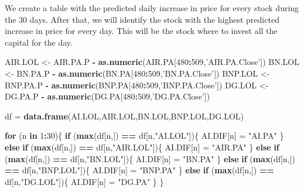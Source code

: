 \documentclass[
  11pt,
]{article}
\newenvironment{Shaded}{\begin{snugshade}}{\end{snugshade}}
\newcommand{\ControlFlowTok}[1]{\textcolor[rgb]{0.13,0.29,0.53}{\textbf{#1}}}
\newcommand{\DecValTok}[1]{\textcolor[rgb]{0.00,0.00,0.81}{#1}}
\newcommand{\KeywordTok}[1]{\textcolor[rgb]{0.13,0.29,0.53}{\textbf{#1}}}
\newcommand{\NormalTok}[1]{#1}
\newcommand{\OperatorTok}[1]{\textcolor[rgb]{0.81,0.36,0.00}{\textbf{#1}}}
\newcommand{\StringTok}[1]{\textcolor[rgb]{0.31,0.60,0.02}{#1}}
\begin{document}
We create a table with the predicted daily increase in price for every
stock during the 30 days. After that, we will identify the stock with
the highest predicted increase in price for every day. This will be the
stock where to invest all the capital for the day.

\begin{Shaded}
\begin{Highlighting}[]
\NormalTok{AIR.LOL <-}\StringTok{ }\NormalTok{AIR.PA.P }\OperatorTok{-}\StringTok{ }\KeywordTok{as.numeric}\NormalTok{(AIR.PA[}\DecValTok{480}\OperatorTok{:}\DecValTok{509}\NormalTok{,}\StringTok{'AIR.PA.Close'}\NormalTok{])}
\NormalTok{BN.LOL <-}\StringTok{ }\NormalTok{BN.PA.P }\OperatorTok{-}\StringTok{ }\KeywordTok{as.numeric}\NormalTok{(BN.PA[}\DecValTok{480}\OperatorTok{:}\DecValTok{509}\NormalTok{,}\StringTok{'BN.PA.Close'}\NormalTok{])}
\NormalTok{BNP.LOL <-}\StringTok{ }\NormalTok{BNP.PA.P }\OperatorTok{-}\StringTok{ }\KeywordTok{as.numeric}\NormalTok{(BNP.PA[}\DecValTok{480}\OperatorTok{:}\DecValTok{509}\NormalTok{,}\StringTok{'BNP.PA.Close'}\NormalTok{])}
\NormalTok{DG.LOL <-}\StringTok{ }\NormalTok{DG.PA.P }\OperatorTok{-}\StringTok{ }\KeywordTok{as.numeric}\NormalTok{(DG.PA[}\DecValTok{480}\OperatorTok{:}\DecValTok{509}\NormalTok{,}\StringTok{'DG.PA.Close'}\NormalTok{])}

\NormalTok{df =}\StringTok{ }\KeywordTok{data.frame}\NormalTok{(AI.LOL,AIR.LOL,BN.LOL,BNP.LOL,DG.LOL)}

\ControlFlowTok{for}\NormalTok{ (n }\ControlFlowTok{in} \DecValTok{1}\OperatorTok{:}\DecValTok{30}\NormalTok{)\{}
   \ControlFlowTok{if}\NormalTok{ (}\KeywordTok{max}\NormalTok{(df[n,]) }\OperatorTok{==}\StringTok{ }\NormalTok{df[n,}\StringTok{"AI.LOL"}\NormalTok{])\{}
\NormalTok{   AI.DIF[n] =}\StringTok{ "AI.PA"}
\NormalTok{   \} }\ControlFlowTok{else} \ControlFlowTok{if}\NormalTok{ (}\KeywordTok{max}\NormalTok{(df[n,]) }\OperatorTok{==}\StringTok{ }\NormalTok{df[n,}\StringTok{"AIR.LOL"}\NormalTok{])\{}
\NormalTok{   AI.DIF[n] =}\StringTok{ "AIR.PA"}
\NormalTok{   \} }\ControlFlowTok{else} \ControlFlowTok{if}\NormalTok{ (}\KeywordTok{max}\NormalTok{(df[n,]) }\OperatorTok{==}\StringTok{ }\NormalTok{df[n,}\StringTok{"BN.LOL"}\NormalTok{])\{}
\NormalTok{   AI.DIF[n] =}\StringTok{ "BN.PA"}
\NormalTok{   \} }\ControlFlowTok{else} \ControlFlowTok{if}\NormalTok{ (}\KeywordTok{max}\NormalTok{(df[n,]) }\OperatorTok{==}\StringTok{ }\NormalTok{df[n,}\StringTok{"BNP.LOL"}\NormalTok{])\{}
\NormalTok{   AI.DIF[n] =}\StringTok{ "BNP.PA"}
\NormalTok{   \} }\ControlFlowTok{else} \ControlFlowTok{if}\NormalTok{ (}\KeywordTok{max}\NormalTok{(df[n,]) }\OperatorTok{==}\StringTok{ }\NormalTok{df[n,}\StringTok{"DG.LOL"}\NormalTok{])\{}
\NormalTok{   AI.DIF[n] =}\StringTok{ "DG.PA"}
\NormalTok{   \}}
\NormalTok{\}}
\end{Highlighting}
\end{Shaded}
\end{document}
